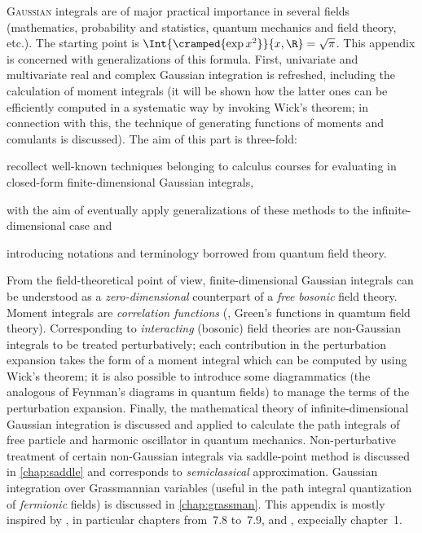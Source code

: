 


\lettrine{G}{aussian} integrals are of major practical importance in several
fields (mathematics, probability and statistics, quantum mechanics and
field theory, etc.). The starting point is $\Int{\cramped{\exp{x^{2}}}}{x,\R} =
\sqrt{\pi}$. This appendix is concerned with generalizations of this formula.
First, univariate and multivariate real and complex Gaussian
integration is refreshed, including the calculation of moment integrals (it will
be shown how the latter ones can be efficiently computed in a systematic way by
invoking Wick's theorem; in connection with this, the technique of generating
functions of moments and comulants is discussed). The aim of this part is
three-fold:
\begin{inparaenum}[(a)]
  \item recollect well-known techniques belonging to calculus courses for
     evaluating in closed-form finite-dimensional Gaussian integrals,
  \item with the aim of eventually apply generalizations of these methods to
     the 
     infinite-dimensional case and
  \item introducing notations and terminology borrowed from quantum field
     theory.
\end{inparaenum}
From the field-theoretical point of view, 
finite-dimensional Gaussian integrals can be understood as a
\emph{zero-dimensional}
counterpart of a \emph{free} \emph{bosonic} field theory. 
Moment integrals are \emph{correlation functions} (\ie, Green's functions in
quamtum field theory). Corresponding to
\emph{interacting} (bosonic) field
theories are non-Gaussian integrals to be treated perturbatively; each
contribution in the perturbation expansion takes the form of
a moment integral which can be computed 
by using Wick's theorem; it is also possible to introduce
some diagrammatics (the analogous of Feynman's diagrams in quantum fields) to manage
the terms of the
perturbation expansion. Finally, the mathematical theory of infinite-dimensional
Gaussian integration is discussed and applied to calculate the path integrals of
free particle and harmonic oscillator in quantum mechanics. Non-perturbative
treatment of certain non-Gaussian integrals via saddle-point method is discussed
in \cref{chap:saddle} and corresponds to \emph{semiclassical} approximation.
Gaussian integration over Grassmannian variables (useful in
the path integral quantization of \emph{fermionic} fields) is discussed in
\cref{chap:grassman}. This appendix is mostly inspired by
\textcite{Zeidler:2009b}, in particular chapters from~7.8 to~7.9, and
\textcite{Zinn-Justin:2005}, expecially chapter~1.

